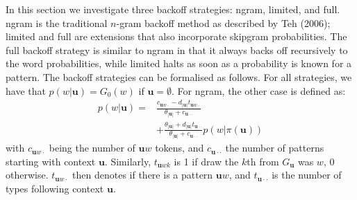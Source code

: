 In this section we investigate three backoff strategies: {\sf ngram}, {\sf limited}, and {\sf full}. {\sf ngram} is the traditional $n$-gram backoff method as described by Teh (2006); {\sf limited} and {\sf full} are extensions that also incorporate skipgram probabilities. The {\sf full} backoff strategy is similar to {\sf ngram} in that it always backs off recursively to the word probabilities, while {\sf limited} halts as soon as a probability is known for a pattern. The backoff strategies can be formalised as follows.
%
For all strategies, we have that $p(w|\mathbf{u})=G_0(w)$ if $\mathbf{u} = \emptyset$. For {\sf ngram}, the other case is defined as:
  \begin{equation*}\begin{split}
  	p(w|\mathbf{u})= &
\frac{c_{\mathbf{u}w\cdot}-d_{|\mathbf{u}|}t_{\mathbf{u}w\cdot}}{\theta_{|\mathbf{u}|}+c_{\mathbf{u}\cdot\cdot}} \\
& +
\frac{\theta_{|\mathbf{u}|}+d_{|\mathbf{u}|}t_{\mathbf{u}\cdot\cdot}}{\theta_{|\mathbf{u}|}+c_{\mathbf{u}\cdot\cdot}}
p(w|\pi(\mathbf{u}))
  \end{split}\end{equation*}
with $c_{\mathbf{u}w\cdot}$ being the number of $\mathbf{u}w$ tokens, and $c_{\mathbf{u}\cdot\cdot}$ the number of patterns starting with context $\mathbf{u}$. Similarly, $t_{\mathbf{u}wk}$ is 1 if draw the $k$th from $G_{\mathbf{u}}$ was $w$, 0 otherwise. $t_{\mathbf{u}w\cdot}$ then denotes if there is a pattern $\mathbf{u}w$, and $t_{\mathbf{u}\cdot\cdot}$ is the number of types following context $\mathbf{u}$.
  
